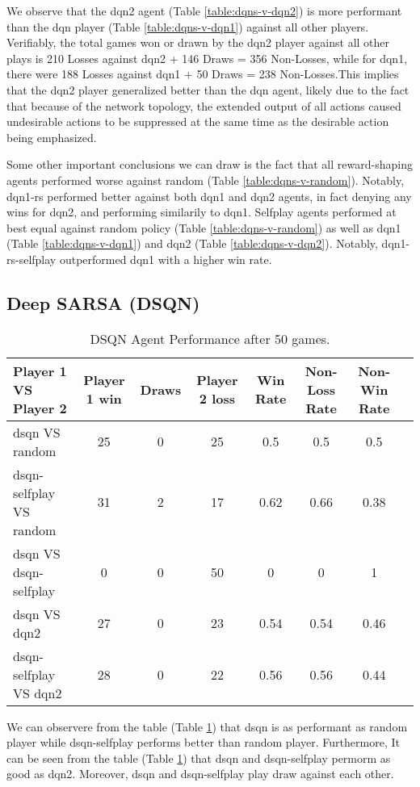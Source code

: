\documentclass[../report.tex]{subfiles}
\begin{document}
We observe that the dqn2 agent (Table \ref{table:dqns-v-dqn2}) is more performant than the dqn player (Table \ref{table:dqns-v-dqn1}) against all other players. Verifiably, the total games won or drawn by the dqn2 player against all other plays is 210 Losses against dqn2 + 146 Draws = 356 Non-Losses, while for dqn1, there were 188 Losses against dqn1 + 50 Draws =  238 Non-Losses.This implies that the dqn2 player generalized better than the dqn agent, likely due to the fact that because of the network topology, the extended output of all actions caused undesirable actions to be suppressed at the same time as the desirable action being emphasized. 

Some other important conclusions we can draw is the fact that all reward-shaping agents performed worse against random (Table \ref{table:dqns-v-random}). Notably, dqn1-rs performed better against both dqn1 and dqn2 agents, in fact denying any wins for dqn2, and performing similarily to dqn1. Selfplay agents performed at best equal against random policy (Table \ref{table:dqns-v-random}) as well as dqn1 (Table \ref{table:dqns-v-dqn1}) and dqn2 (Table \ref{table:dqns-v-dqn2}). Notably, dqn1-rs-selfplay outperformed dqn1 with a higher win rate.

\subsection{Deep SARSA (DSQN)}

\begin{table}[!htbp]
    \centering
    \caption{DSQN Agent Performance after 50 games.}\label{table:dsqn}
    \begin{tabular}{lccccccc}
        \toprule
        Player 1 VS Player 2            & Player 1 win & Draws & Player 2 loss & Win Rate & Non-Loss Rate & Non-Win Rate \\
        \midrule
        dsqn VS random                  & 25    & 0    & 25      & 0.5        & 0.5             & 0.5            \\
        dsqn-selfplay VS random         & 31   & 2     & 17     & 0.62     & 0.66          & 0.38         \\
        dsqn VS dsqn-selfplay           & 0   & 0     & 50     & 0     & 0         & 1         \\
        dsqn VS dqn2                    & 27  & 0     & 23     & 0.54     & 0.54          & 0.46         \\
        dsqn-selfplay VS dqn2           & 28   & 0     & 22     & 0.56      & 0.56           & 0.44          \\
       \bottomrule
    \end{tabular}
\end{table}

We can observere from the table (Table \ref{table:dsqn}) that dsqn is as performant as random player while dsqn-selfplay performs better than random player. Furthermore, It can be seen from the table (Table \ref{table:dsqn}) that dsqn and dsqn-selfplay permorm as good as dqn2. Moreover, dsqn and dsqn-selfplay play draw against each other.
\end{document}
